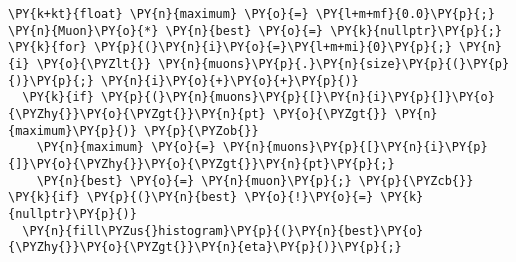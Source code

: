 \begin{Verbatim}[commandchars=\\\{\}]
\PY{k+kt}{float} \PY{n}{maximum} \PY{o}{=} \PY{l+m+mf}{0.0}\PY{p}{;}
\PY{n}{Muon}\PY{o}{*} \PY{n}{best} \PY{o}{=} \PY{k}{nullptr}\PY{p}{;}
\PY{k}{for} \PY{p}{(}\PY{n}{i}\PY{o}{=}\PY{l+m+mi}{0}\PY{p}{;} \PY{n}{i} \PY{o}{\PYZlt{}} \PY{n}{muons}\PY{p}{.}\PY{n}{size}\PY{p}{(}\PY{p}{)}\PY{p}{;} \PY{n}{i}\PY{o}{+}\PY{o}{+}\PY{p}{)}
  \PY{k}{if} \PY{p}{(}\PY{n}{muons}\PY{p}{[}\PY{n}{i}\PY{p}{]}\PY{o}{\PYZhy{}}\PY{o}{\PYZgt{}}\PY{n}{pt} \PY{o}{\PYZgt{}} \PY{n}{maximum}\PY{p}{)} \PY{p}{\PYZob{}}
    \PY{n}{maximum} \PY{o}{=} \PY{n}{muons}\PY{p}{[}\PY{n}{i}\PY{p}{]}\PY{o}{\PYZhy{}}\PY{o}{\PYZgt{}}\PY{n}{pt}\PY{p}{;}
    \PY{n}{best} \PY{o}{=} \PY{n}{muon}\PY{p}{;} \PY{p}{\PYZcb{}}
\PY{k}{if} \PY{p}{(}\PY{n}{best} \PY{o}{!}\PY{o}{=} \PY{k}{nullptr}\PY{p}{)}
  \PY{n}{fill\PYZus{}histogram}\PY{p}{(}\PY{n}{best}\PY{o}{\PYZhy{}}\PY{o}{\PYZgt{}}\PY{n}{eta}\PY{p}{)}\PY{p}{;}
\end{Verbatim}
